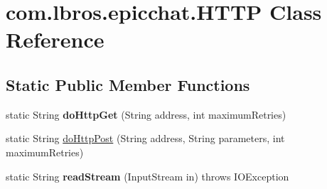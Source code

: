 \hypertarget{classcom_1_1lbros_1_1epicchat_1_1_h_t_t_p}{\section{com.\-lbros.\-epicchat.\-H\-T\-T\-P Class Reference}
\label{classcom_1_1lbros_1_1epicchat_1_1_h_t_t_p}
}
\subsection*{Static Public Member Functions}
\begin{DoxyCompactItemize}
\item 
\hypertarget{classcom_1_1lbros_1_1epicchat_1_1_h_t_t_p_ab02692501c8001f127e1fc1d948e6642}{static String {\bfseries do\-Http\-Get} (String address, int maximum\-Retries)}\label{classcom_1_1lbros_1_1epicchat_1_1_h_t_t_p_ab02692501c8001f127e1fc1d948e6642}

\item 
static String \hyperlink{classcom_1_1lbros_1_1epicchat_1_1_h_t_t_p_a5db934e0b29b0510a57798d487ff4ac3}{do\-Http\-Post} (String address, String parameters, int maximum\-Retries)
\item 
\hypertarget{classcom_1_1lbros_1_1epicchat_1_1_h_t_t_p_a978b3d249140eb8680e186157b784e7f}{static String {\bfseries read\-Stream} (Input\-Stream in)  throws I\-O\-Exception }\label{classcom_1_1lbros_1_1epicchat_1_1_h_t_t_p_a978b3d249140eb8680e186157b784e7f}

\end{DoxyCompactItemize}


